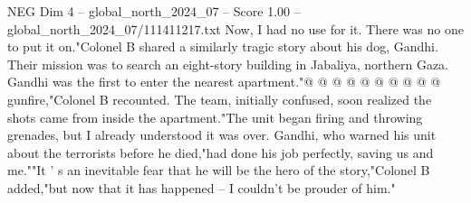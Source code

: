 \begin{textsample}{NEG Dim 4 – global\_north\_2024\_07 – Score 1.00 – global\_north\_2024\_07/111411217.txt}
Now, I had no use for it.
There was no one to put it on."Colonel B shared a similarly tragic story about his dog, Gandhi.
Their mission was to search an eight-story building in Jabaliya, northern Gaza.
Gandhi was the first to enter the nearest apartment."@ @ @ @ @ @ @ @ @ @ gunfire,"Colonel B recounted.
The team, initially confused, soon realized the shots came from inside the apartment."The unit began firing and throwing grenades, but I already understood it was over.
Gandhi, who warned his unit about the terrorists before he died,"had done his job perfectly, saving us and me.""It ' s an inevitable fear that he will be the hero of the story,"Colonel B added,"but now that it has happened -- I couldn't be prouder of him."

\end{textsample}
